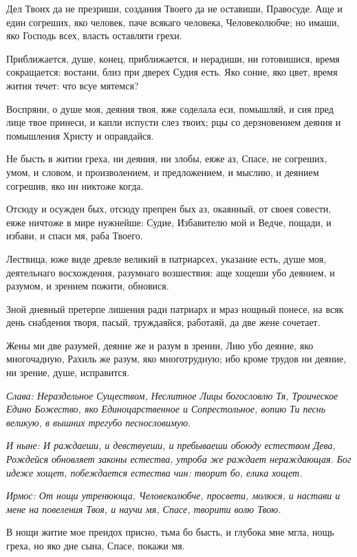 Дел Твоих да не презриши, создания Твоего да не оставиши, Правосуде. Аще и един согреших, яко человек, паче всякаго человека, Человеколюбче; но имаши, яко Господь всех, власть оставляти грехи. 

Приближается, душе, конец, приближается, и нерадиши, ни готовишися, время сокращается: востани, близ при дверех Судия есть. Яко соние, яко цвет, время жития течет: что всуе мятемся? 

Воспряни, о душе моя, деяния твоя, яже соделала еси, помышляй, и сия пред лице твое принеси, и капли испусти слез твоих; рцы со дерзновением деяния и помышления Христу и оправдайся. 

Не бысть в житии греха, ни деяния, ни злобы, еяже аз, Спасе, не согреших, умом, и словом, и произволением, и предложением, и мыслию, и деянием согрешив, яко ин никтоже когда. 

Отсюду и осужден бых, отсюду препрен бых аз, окаянный, от своея совести, еяже ничтоже в мире нужнейше: Судие, Избавителю мой и Ведче, пощади, и избави, и спаси мя, раба Твоего. 

Лествица, юже виде древле великий в патриарсех, указание есть, душе моя, деятельнаго восхождения, разумнаго возшествия: аще хощеши убо деянием, и разумом, и зрением пожити, обновися. 

Зной дневный претерпе лишения ради патриарх и мраз нощный понесе, на всяк день снабдения творя, пасый, труждаяйся, работаяй, да две жене сочетает. 

Жены ми две разумей, деяние же и разум в зрении, Лию убо деяние, яко многочадную, Рахиль же разум, яко многотрудную; ибо кроме трудов ни деяние, ни зрение, душе, исправится. 

\itshape Слава\normalfont{}: Нераздельное Существом, Неслитное Лицы богословлю Тя, Троическое Едино Божество, яко Единоцарственное и Сопрестольное, вопию Ти песнь великую, в вышних трегубо песнословимую. 

\itshape И ныне\normalfont{}: И раждаеши, и девствуеши, и пребываеши обоюду естеством Дева, Рождейся обновляет законы естества, утроба же раждает нераждающая. Бог идеже хощет, побеждается естества чин: творит бо, елика хощет. 


\itshape Ирмос\normalfont{}: От нощи утренююща, Человеколюбче, просвети, молюся, и настави и мене на повеления Твоя, и научи мя, Спасе, творити волю Твою. 

В нощи житие мое преидох присно, тьма бо бысть, и глубока мне мгла, нощь греха, но яко дне сына, Спасе, покажи мя. 

